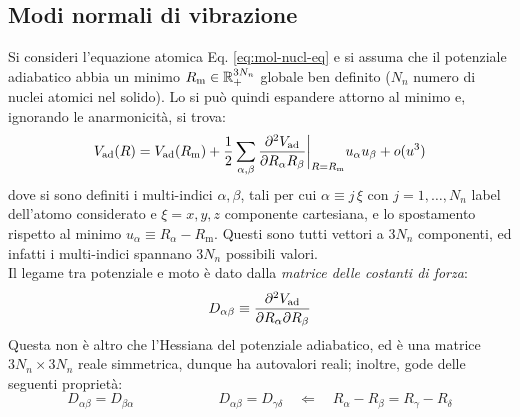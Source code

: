 \subsection{Modi normali di vibrazione}

Si consideri l'equazione atomica Eq. \ref{eq:mol-nucl-eq} e si assuma che il potenziale adiabatico abbia un minimo $ R_\text{m} \in \mathbb{R}_+^{3N_n} $ globale ben definito ($ N_n $ numero di nuclei atomici nel solido). Lo si può quindi espandere attorno al minimo e, ignorando le anarmonicità, si trova:
\begin{equation}
	V_\text{ad}(R) = V_\text{ad}(R_\text{m}) + \frac{1}{2} \sum_{\alpha,\beta} \frac{\partial^2 V_\text{ad}}{\partial R_\alpha R_\beta}\bigg\vert_{R = R_\text{m}} u_\alpha u_\beta + o(u^3)
\end{equation}
dove si sono definiti i multi-indici $ \alpha , \beta $, tali per cui $ \alpha \equiv j\,\xi $ con $ j = 1, \dots, N_n $ label dell'atomo considerato e $ \xi = x,y,z $ componente cartesiana, e lo spostamento rispetto al minimo $ u_\alpha \equiv R_\alpha - R_\text{m} $. Questi sono tutti vettori a $ 3N_n $ componenti, ed infatti i multi-indici spannano $ 3N_n $ possibili valori. \\
Il legame tra potenziale e moto è dato dalla \textit{matrice delle costanti di forza}:
\begin{equation}
	D_{\alpha \beta} \equiv \frac{\partial^2 V_\text{ad}}{\partial R_\alpha \partial R_\beta}
\end{equation}
Questa non è altro che l'Hessiana del potenziale adiabatico, ed è una matrice $ 3N_n \times 3N_n $ reale simmetrica, dunque ha autovalori reali; inoltre, gode delle seguenti proprietà:
\begin{equation}
	D_{\alpha \beta} = D_{\beta \alpha}
	\qquad \qquad \qquad
	D_{\alpha \beta} = D_{\gamma \delta}
	\quad \Leftarrow \quad
	R_\alpha - R_\beta = R_\gamma - R_\delta
	\label{eq:d-inv}
\end{equation}

